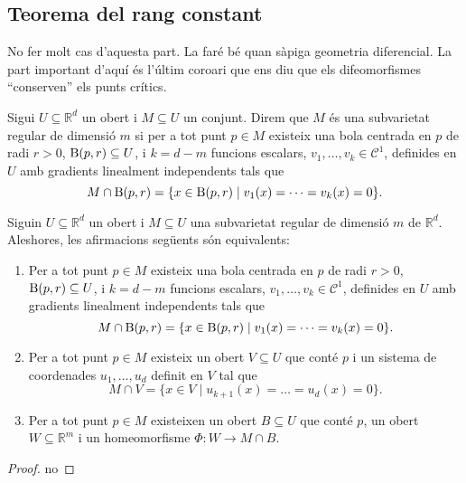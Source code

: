 \documentclass[../Apunts.tex]{subfiles}
\begin{document}
	\subsection{Teorema del rang constant} No fer molt cas d'aquesta part. La faré bé quan sàpiga geometria diferencial. La part important d'aquí és l'últim coro{\lgem}ari que ens diu que els difeomorfismes ``conserven'' els punts crítics.
	\begin{definition}
		\label{def:subvarietat regular}
		Sigui \(U\subseteq\mathbb{R}^{d}\) un obert i \(M\subseteq U\) un conjunt. Direm que \(M\) és una subvarietat regular de dimensió \(m\) si per a tot punt \(p\in M\) existeix una bola centrada en \(p\) de radi \(r>0\), \(\operatorname{B}(p,r)\subseteq U\), i \(k=d-m\) funcions escalars, \(v_{1},\dots,v_{k}\in\mathcal{C}^{1}\), definides en \(U\) amb gradients linealment independents tals que
		\[M\cap\operatorname{B}(p,r)=\{x\in\operatorname{B}(p,r)\mid v_{1}(x)=\dots=v_{k}(x)=0\}.\]
	\end{definition}
	\begin{proposition}\label{prop:definicions subvarietat equivalents}
		Siguin \(U\subseteq\mathbb{R}^{d}\) un obert i \(M\subseteq U\) una subvarietat regular de dimensió \(m\) de \(\mathbb{R}^{d}\). Aleshores, les afirmacions següents són equivalents:
		\begin{enumerate}
			\item Per a tot punt \(p\in M\) existeix una bola centrada en \(p\) de radi \(r>0\), \(\operatorname{B}(p,r)\subseteq U\), i \(k=d-m\) funcions escalars, \(v_{1},\dots,v_{k}\in\mathcal{C}^{1}\), definides en \(U\) amb gradients linealment independents tals que
			\[M\cap\operatorname{B}(p,r)=\{x\in\operatorname{B}(p,r)\mid v_{1}(x)=\dots=v_{k}(x)=0\}.\]
			\item Per a tot punt \(p\in M\) existeix un obert \(V\subseteq U\) que conté \(p\) i un sistema de coordenades \(u_{1},\dots,u_{d}\) definit en \(V\) tal que
			\[M\cap V=\{x\in V\mid u_{k+1}(x)=\dots=u_{d}(x)=0\}.\]
			\item Per a tot punt \(p\in M\) existeixen un obert \(B\subseteq U\) que conté \(p\), un obert \(W\subseteq\mathbb{R}^{m}\) i un homeomorfisme \(\Phi\colon W\to M\cap B\).
		\end{enumerate}
		\begin{proof}
			no %
		\end{proof}
	\end{proposition}
\end{document}
